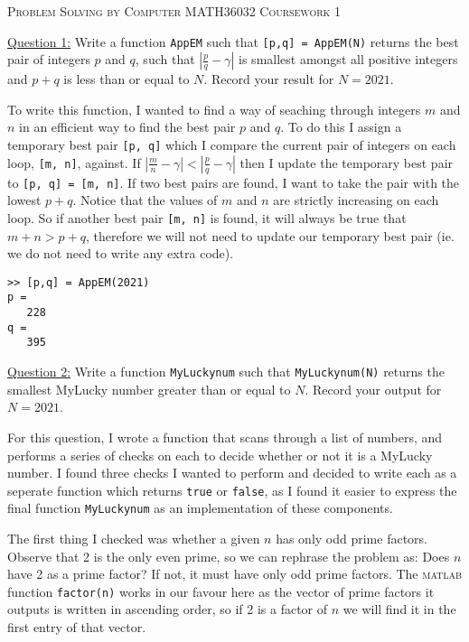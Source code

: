 \documentclass[a4paper,12pt]{article}
\begin{document}
\begin{center}
\Large\textsc{Problem Solving by Computer MATH36032}
\Large\textsc{Coursework 1}
\end{center}

\noindent\large\underline{Question 1:} \hspace{0.25cm} Write a function \verb!AppEM! such that \verb![p,q] = AppEM(N)! returns the best pair of integers $p$ and $q$, such that $|\frac{p}{q}-\gamma|$ is smallest amongst all positive integers and $p+q$ is less than or equal to $N$.  Record your result for $N= 2021$. 

To write this function, I wanted to find a way of seaching through integers $m$ and $n$ in an efficient way to find the best pair $p$ and $q$. To do this I assign a temporary best pair \verb![p, q]! which I compare the current pair of integers on each loop, \verb![m, n]!, against. If $|\frac{m}{n}-\gamma| <  |\frac{p}{q}-\gamma|$ then I update the temporary best pair to \verb![p, q] = [m, n]!. If two best pairs are found, I want to take the pair with the lowest $p+q$. Notice that the values of $m$ and $n$ are strictly increasing on each loop. So if another best pair \verb![m, n]! is found, it will always be true that $m+n > p+q$, therefore we will not need to update our temporary best pair (ie. we do not need to write any extra code).




\begin{lstlisting}
>> [p,q] = AppEM(2021)
p =
   228
q =
   395
\end{lstlisting}
\newpage
\noindent\large\underline{Question 2:} \hspace{0.25cm} Write a function \verb!MyLuckynum! such that \verb!MyLuckynum(N)! returns the smallest MyLucky number greater than or equal to $N$.  Record your output for $N=2021$.

For this question, I wrote a function that scans through a list of numbers, and performs a series of checks on each to decide whether or not it is a MyLucky number. I found three checks I wanted to perform and decided to write each as a seperate function which returns \verb!true! or \verb!false!, as I found it easier to express the final function \verb!MyLuckynum! as an implementation of these components.

The first thing I checked was whether a given $n$ has only odd prime factors. Observe that 2 is the only even prime, so we can rephrase the problem as: Does $n$ have 2 as a prime factor? If not, it must have only odd prime factors. The \textsc{matlab} function \verb!factor(n)! works in our favour here as the vector of prime factors it outputs is written in ascending order, so if 2 is a factor of $n$ we will find it in the first entry of that vector.

\end{document}
